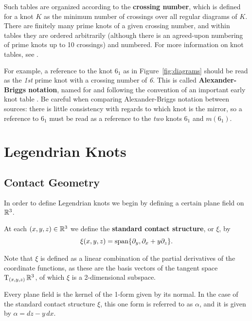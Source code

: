 Such tables are organized according to the \textbf{crossing number}, which is defined for a knot $K$ as the minimum number of crossings over all regular diagrams of $K$.
There are finitely many prime knots of a given crossing number, and within tables they are ordered arbitrarily (although there is an agreed-upon numbering of prime knots up to 10 crossings) and numbered. For more information on knot tables, see \cite{hoste}.

For example, a reference to the knot $6_1$ as in Figure~\ref{fig:diagrams} should be read as the \emph{1st} prime knot with a crossing number of \emph{6}. This is called \textbf{Alexander-Briggs notation}, named for and following the convention of an important early knot table \cite{alexander-briggs}. Be careful when comparing Alexander-Briggs notation between sources: there is little consistency with regards to which knot is the mirror, so a reference to $6_1$ must be read as a reference to the \emph{two} knots $6_1$ and $m(6_1)$.

\section{Legendrian Knots}\label{sec:legendrian}
\subsection{Contact Geometry}\label{subsec:contact}

In order to define Legendrian knots we begin by defining a certain plane field on $\mathbb{R}^3$.

\begin{definition}\label{defn:xi}
    At each $(x, y, z) \in \mathbb{R}^3$ we define the \textbf{standard contact structure}, or $\xi$, by 
    \[
        \xi(x, y, z) = \operatorname{span} \{\partial_y, \partial_x + y\partial_z\}.
    \]
\end{definition}

Note that $\xi$ is defined as a linear combination of the partial derivatives of the coordinate functions, as these are the basis vectors of the tangent space $\operatorname{T}_{(x, y, z)} \mathbb{R}^3$, of which $\xi$ is a 2-dimensional subspace.

Every plane field is the kernel of the 1-form given by its normal. In the case of the standard contact structure $\xi$, this one form is referred to as $\alpha$, and it is given by ${\alpha = dz - y \, dx}$.

